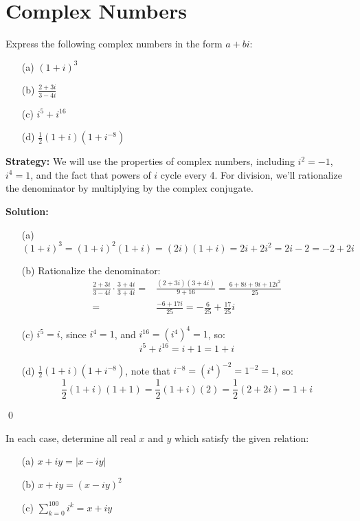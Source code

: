 \section{Complex Numbers}

\begin{problembox}
Express the following complex numbers in the form \( a + bi \):

\begin{enumerate}
\item[(a)] \( (1 + i)^3 \)
\item[(b)] \( \frac{2 + 3i}{3 - 4i} \)
\item[(c)] \( i^5 + i^{16} \)
\item[(d)] \( \frac{1}{2}(1 + i)(1 + i^{-8}) \)
\end{enumerate}
\end{problembox}

\noindent\textbf{Strategy:} We will use the properties of complex numbers, including $i^2 = -1$, $i^4 = 1$, and the fact that powers of $i$ cycle every 4. For division, we'll rationalize the denominator by multiplying by the complex conjugate.

\bigskip\noindent\textbf{Solution:}

\begin{itemize}
\item[(a)] \( (1 + i)^3 = (1 + i)^2 (1 + i) = (2i)(1 + i) = 2i + 2i^2 = 2i - 2 = -2 + 2i \)

\item[(b)] Rationalize the denominator:
\begin{align*}
\frac{2 + 3i}{3 - 4i} \cdot \frac{3 + 4i}{3 + 4i} =& \frac{(2 + 3i)(3 + 4i)}{9 + 16} = \frac{6 + 8i + 9i + 12i^2}{25} \\
=& \frac{-6 + 17i}{25} = -\frac{6}{25} + \frac{17}{25}i
\end{align*}

\item[(c)] \( i^5 = i \), since \( i^4 = 1 \), and \( i^{16} = (i^4)^4 = 1 \), so:
\[
i^5 + i^{16} = i + 1 = 1 + i
\]

\item[(d)] \( \frac{1}{2}(1 + i)(1 + i^{-8}) \), note that \( i^{-8} = (i^4)^{-2} = 1^{-2} = 1 \), so:
\[
\frac{1}{2}(1 + i)(1 + 1) = \frac{1}{2}(1 + i)(2) = \frac{1}{2}(2 + 2i) = 1 + i
\]
\end{itemize}\qed


\begin{problembox}
In each case, determine all real \( x \) and \( y \) which satisfy the given relation:

\begin{enumerate}
\item[(a)] \( x + iy = |x - iy| \)
\item[(b)] \( x + iy = (x - iy)^2 \)
\item[(c)] \( \sum_{k=0}^{100} i^k = x + iy \)
\end{enumerate}
\end{problembox}

